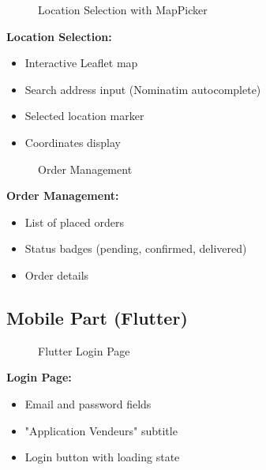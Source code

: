 \documentclass[12pt,a4paper]{article}
\begin{document}
\begin{figure}[h]
    \centering
    \caption{Location Selection with MapPicker}
\end{figure}

\textbf{Location Selection:}
\begin{itemize}
    \item Interactive Leaflet map
    \item Search address input (Nominatim autocomplete)
    \item Selected location marker
    \item Coordinates display
\end{itemize}

\begin{figure}[h]
    \centering
    \caption{Order Management}
\end{figure}

\textbf{Order Management:}
\begin{itemize}
    \item List of placed orders
    \item Status badges (pending, confirmed, delivered)
    \item Order details
\end{itemize}

\subsection{Mobile Part (Flutter)}

\begin{figure}[h]
    \centering
    \caption{Flutter Login Page}
\end{figure}

\textbf{Login Page:}
\begin{itemize}
    \item Email and password fields
    \item "Application Vendeurs" subtitle
    \item Login button with loading state
\end{itemize}
\end{document}
